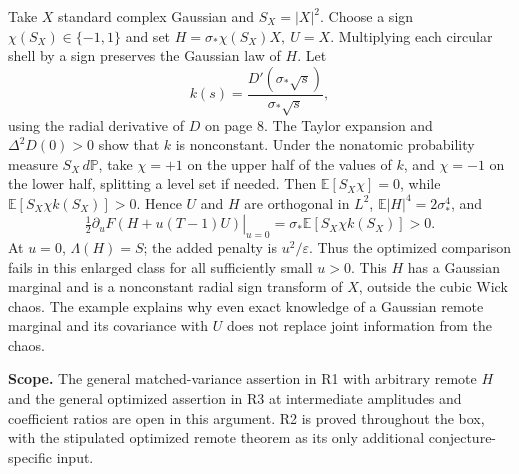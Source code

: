 \documentclass[11pt]{article}
\newcommand{\E}{\mathbb E}
\newcommand{\PP}{\mathbb P}
\begin{document}
Take \(X\) standard complex Gaussian and \(S_X=|X|^2\).
Choose a sign \(\chi(S_X)\in\{-1,1\}\) and set \(H=\sigma_*\chi(S_X)X,\ U=X\).
Multiplying each circular shell by a sign preserves the Gaussian law of \(H\).
Let
\[
       k(s)=\frac{D'(\sigma_*\sqrt s)}{\sigma_*\sqrt s},
\]
using the radial derivative of \(D\) on page 8. The Taylor expansion and
\(\Delta^2D(0)>0\) show that \(k\) is nonconstant. Under the nonatomic
probability measure \(S_X\,d\PP\), take \(\chi=+1\) on the upper half of the
values of \(k\), and \(\chi=-1\) on the lower half, splitting a level set if needed.
Then \(\E[S_X\chi]=0\), while \(\E[S_X\chi k(S_X)]>0\). Hence \(U\) and \(H\)
are orthogonal in \(L^2\), \(\E|H|^4=2\sigma_*^4\), and
\[
 \left.\tfrac12\partial_u F(H+u(T-1)U)\right|_{u=0}
       =\sigma_*\E[S_X\chi k(S_X)]>0.
\]
At \(u=0\), \(\Lambda(H)=S\); the added penalty is \(u^2/\varepsilon\).
Thus the optimized comparison fails in this enlarged class for all sufficiently
small \(u>0\). This \(H\) has a Gaussian marginal and is a nonconstant radial
sign transform of \(X\), outside the cubic Wick chaos. The example explains why
even exact knowledge of a Gaussian remote marginal and its covariance with \(U\)
does not replace joint information from the chaos.

\medskip
\textbf{Scope.} The general matched-variance assertion in R1 with arbitrary remote
\(H\) and the general optimized assertion in R3 at intermediate amplitudes
and coefficient ratios are open in this argument. R2 is proved throughout the box,
with the stipulated optimized remote theorem as its only additional conjecture-specific input.
\end{document}
